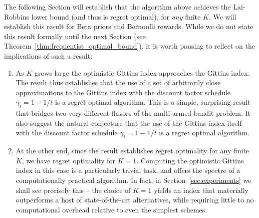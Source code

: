 The following Section will establish that the algorithm above achieves the Lai-Robbins lower bound (and thus is regret optimal), for {\em any} finite $K$. We will establish this result for Beta priors and Bernoulli rewards. While we do not state this result formally until the next Section (see Theorem~\ref{thm:frequentist_optimal_bound}), it is worth pausing to reflect on the implications of such a result:
\begin{enumerate}
\item As $K$ grows large the optimistic Gittins index approaches the Gittins index. The result thus establishes that the use of a set of arbitrarily close approximations to the Gittins index with the discount factor schedule $\gamma_t = 1-1/t$ is a regret optimal algorithm. This is a simple, surprising result that bridges two very different flavors of the multi-armed bandit problem. It also suggest the natural conjecture that the use of the Gittins index itself with the discount factor schedule $\gamma_t = 1-1/t$ is a regret optimal algorithm.
\item At the other end, since the result establishes regret optimality for any finite $K$, we have regret optimality for $K=1$. Computing the optimistic Gittins index in this case is a particularly trivial task, and offers the spectre of a computationally practical algorithm. In fact, in Section~\ref{sec:experiments} we shall see precisely this -- the choice of $K=1$ yields an index that materially outperforms a host of state-of-the-art alternatives, while requiring little to no computational overhead relative to even the simplest schemes. 
\end{enumerate}

